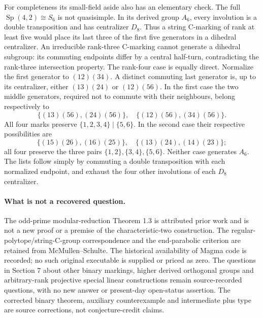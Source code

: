\documentclass[11pt,a4paper]{article}
\begin{document}
For completeness its small-field aside also has an elementary
check. The full $\operatorname{Sp}(4,2)\cong S_6$ is not
quasisimple. In its derived group $A_6$, every involution is a
double transposition and has centralizer $D_8$. Thus a string
C-marking of rank at least five would place its last three of
the first five generators in a dihedral centralizer. An irreducible
rank-three C-marking cannot generate a dihedral subgroup: its
commuting endpoints differ by a central half-turn, contradicting
the rank-three intersection property. The rank-four case is equally
direct. Normalize the first generator to $(12)(34)$. A distinct
commuting last generator is, up to its centralizer,
either $(13)(24)$ or $(12)(56)$. In the first case the two middle
generators, required not to commute with their neighbours, belong
respectively to
\[
 \{(13)(56),(24)(56)\},\quad
 \{(12)(56),(34)(56)\}.
\]
All four marks preserve $\{1,2,3,4\}\mid\{5,6\}$.
In the second case their respective possibilities are
\[
 \{(15)(26),(16)(25)\},\quad
 \{(13)(24),(14)(23)\};
\]
all four preserve the three pairs $\{1,2\},\{3,4\},\{5,6\}$.
Neither case generates $A_6$. The lists follow simply by commuting
a double transposition with each normalized endpoint, and exhaust
the four other involutions of each $D_8$ centralizer.

\paragraph{What is not a recovered question.}
The odd-prime modular-reduction Theorem 1.3 is attributed prior work
and is not a new proof or a premise of the characteristic-two
construction. The regular-polytope/string-C-group correspondence
and the end-parabolic criterion are retained from
McMullen--Schulte. The historical availability of Magma code is
recorded; no such original executable is supplied or priced as zero.
The questions in Section 7 about other binary markings, higher
derived orthogonal groups and arbitrary-rank projective special
linear constructions remain source-recorded questions, with no
new answer or present-day open-status assertion. The corrected
binary theorem, auxiliary counterexample and intermediate plus
type are source corrections, not conjecture-credit claims.
\end{document}
